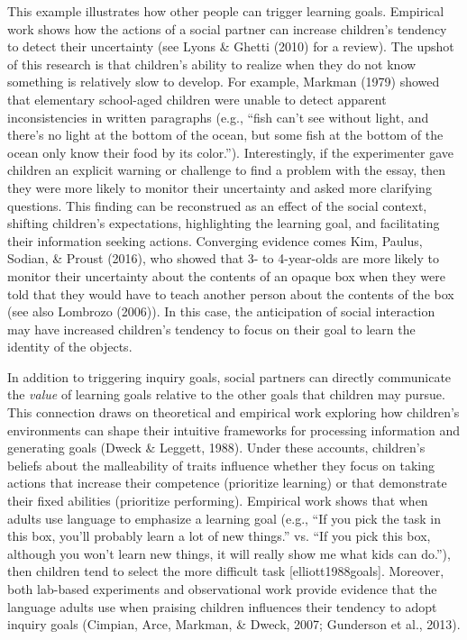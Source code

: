 \documentclass[oneside]{report}
\begin{document}
This example illustrates how other people can trigger learning goals.
Empirical work shows how the actions of a social partner can increase
children's tendency to detect their uncertainty (see Lyons \& Ghetti
(2010) for a review). The upshot of this research is that children's
ability to realize when they do not know something is relatively slow to
develop. For example, Markman (1979) showed that elementary school-aged
children were unable to detect apparent inconsistencies in written
paragraphs (e.g., ``fish can't see without light, and there's no light
at the bottom of the ocean, but some fish at the bottom of the ocean
only know their food by its color.''). Interestingly, if the
experimenter gave children an explicit warning or challenge to find a
problem with the essay, then they were more likely to monitor their
uncertainty and asked more clarifying questions. This finding can be
reconstrued as an effect of the social context, shifting children's
expectations, highlighting the learning goal, and facilitating their
information seeking actions. Converging evidence comes Kim, Paulus,
Sodian, \& Proust (2016), who showed that 3- to 4-year-olds are more
likely to monitor their uncertainty about the contents of an opaque box
when they were told that they would have to teach another person about
the contents of the box (see also Lombrozo (2006)). In this case, the
anticipation of social interaction may have increased children's
tendency to focus on their goal to learn the identity of the objects.

In addition to triggering inquiry goals, social partners can directly
communicate the \emph{value} of learning goals relative to the other
goals that children may pursue. This connection draws on theoretical and
empirical work exploring how children's environments can shape their
intuitive frameworks for processing information and generating goals
(Dweck \& Leggett, 1988). Under these accounts, children's beliefs about
the malleability of traits influence whether they focus on taking
actions that increase their competence (prioritize learning) or that
demonstrate their fixed abilities (prioritize performing). Empirical
work shows that when adults use language to emphasize a learning goal
(e.g., ``If you pick the task in this box, you'll probably learn a lot
of new things.'' vs. ``If you pick this box, although you won't learn
new things, it will really show me what kids can do.''), then children
tend to select the more difficult task {[}elliott1988goals{]}. Moreover,
both lab-based experiments and observational work provide evidence that
the language adults use when praising children influences their tendency
to adopt inquiry goals (Cimpian, Arce, Markman, \& Dweck, 2007;
Gunderson et al., 2013).
\end{document}

